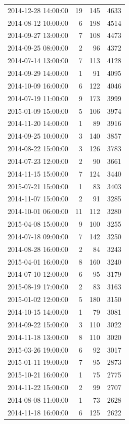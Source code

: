 \begin{tabular}{lrrr}
2014-12-28 14:00:00 & 19 & 145 & 4633 \\
2014-08-12 10:00:00 & 6 & 198 & 4514 \\
2014-09-27 13:00:00 & 7 & 108 & 4473 \\
2014-09-25 08:00:00 & 2 & 96 & 4372 \\
2014-07-14 13:00:00 & 7 & 113 & 4128 \\
2014-09-29 14:00:00 & 1 & 91 & 4095 \\
2014-10-09 16:00:00 & 6 & 122 & 4046 \\
2014-07-19 11:00:00 & 9 & 173 & 3999 \\
2015-01-09 15:00:00 & 5 & 106 & 3974 \\
2014-11-20 14:00:00 & 1 & 89 & 3916 \\
2014-09-25 10:00:00 & 3 & 140 & 3857 \\
2014-08-22 15:00:00 & 3 & 126 & 3783 \\
2014-07-23 12:00:00 & 2 & 90 & 3661 \\
2014-11-15 15:00:00 & 7 & 124 & 3440 \\
2015-07-21 15:00:00 & 1 & 83 & 3403 \\
2014-11-07 15:00:00 & 2 & 91 & 3285 \\
2014-10-01 06:00:00 & 11 & 112 & 3280 \\
2015-04-08 15:00:00 & 9 & 100 & 3255 \\
2014-07-18 09:00:00 & 7 & 142 & 3250 \\
2014-08-28 16:00:00 & 2 & 84 & 3243 \\
2015-04-01 16:00:00 & 8 & 160 & 3240 \\
2014-07-10 12:00:00 & 6 & 95 & 3179 \\
2015-08-19 17:00:00 & 2 & 83 & 3163 \\
2015-01-02 12:00:00 & 5 & 180 & 3150 \\
2014-10-15 14:00:00 & 1 & 79 & 3081 \\
2014-09-22 15:00:00 & 3 & 110 & 3022 \\
2014-11-18 13:00:00 & 8 & 110 & 3020 \\
2015-03-26 19:00:00 & 6 & 92 & 3017 \\
2015-01-11 19:00:00 & 7 & 95 & 2873 \\
2015-10-21 16:00:00 & 1 & 75 & 2775 \\
2014-11-22 15:00:00 & 2 & 99 & 2707 \\
2014-08-08 11:00:00 & 1 & 73 & 2628 \\
2014-11-18 16:00:00 & 6 & 125 & 2622 \\

\end{tabular}

